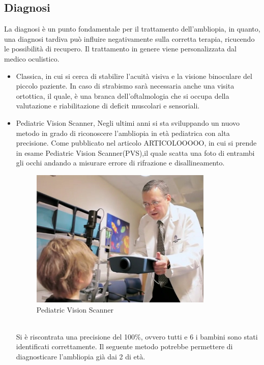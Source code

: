 \documentclass[10pt,a4paper]{article}
\begin{document}
	\subsection{Diagnosi}
	La diagnosi è un punto fondamentale per il trattamento dell'ambliopia, in quanto, una diagnosi tardiva può influire negativamente sulla corretta terapia, ricucendo le possibilità di recupero.
	Il trattamento in genere viene personalizzata dal medico oculistico.
	\begin{itemize}
		\item Classica, in cui si cerca di stabilire l'acuità visiva e la visione binoculare del piccolo paziente. In caso di strabismo sarà necessaria anche una visita ortottica, il quale, è una branca dell'oftalmologia che si occupa della valutazione e riabilitazione di deficit muscolari e sensoriali.
		\item Pediatric Vision Scanner, Negli ultimi anni si sta sviluppando un nuovo metodo in grado di riconoscere l'ambliopia in età pediatrica con alta precisione.
		Come pubblicato nel articolo 	ARTICOLOOOOO, in cui si prende in esame Pediatric Vision Scanner(PVS),il quale scatta una foto di entrambi gli occhi andando a misurare errore di rifrazione e disallineamento.
			\begin{figure}[h]
			\centering
			\includegraphics[width=0.5\linewidth]{image/pvs}
			\caption{Pediatric Vision Scanner}
			\label{fig:pvs}
		\end{figure}\\
		Si è riscontrata una precisione del 100\%, ovvero tutti e 6 i bambini sono stati identificati correttamente.
		Il seguente metodo potrebbe permettere di diagnosticare l'ambliopia già dai 2 di età.
	
	\end{itemize}
   
\end{document}

